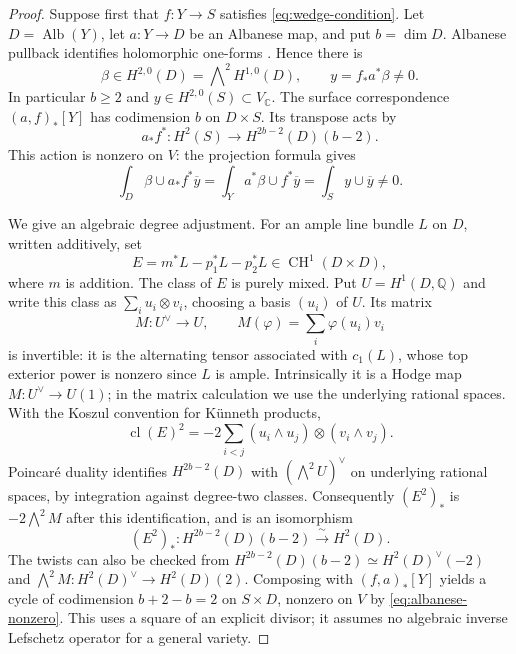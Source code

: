\begin{proof}
Suppose first that $f:Y\to S$ satisfies \eqref{eq:wedge-condition}. Let $D=\operatorname{Alb}(Y)$, let $a:Y\to D$ be an Albanese map, and put $b=\dim D$. Albanese pullback identifies holomorphic one-forms \cite[Chapter VI, \S9.2, pp.~315--316]{Albanese}. Hence there is
\[
 \beta\in H^{2,0}(D)=\bigwedge\nolimits^2H^{1,0}(D),\qquad
 y=f_*a^*\beta\ne0.
\]
In particular $b\ge2$ and $y\in H^{2,0}(S)\subset V_{\mathbb C}$. The surface correspondence $(a,f)_*[Y]$ has codimension $b$ on $D\times S$. Its transpose acts by
\[
 a_*f^*:H^2(S)\longrightarrow H^{2b-2}(D)(b-2).
\]
This action is nonzero on $V$: the projection formula gives
\begin{equation}\label{eq:albanese-nonzero}
 \int_D\beta\cup a_*f^*\overline y
 =\int_Ya^*\beta\cup f^*\overline y
 =\int_Sy\cup\overline y\ne0.
\end{equation}

We give an algebraic degree adjustment. For an ample line bundle $L$ on $D$, written additively, set
\[
 E=m^*L-p_1^*L-p_2^*L\in\operatorname{CH}^1(D\times D),
\]
where $m$ is addition. The class of $E$ is purely mixed. Put $U=H^1(D,\mathbb Q)$ and write this class as $\sum_i u_i\otimes v_i$, choosing a basis $(u_i)$ of $U$. Its matrix
\[
 M:U^\vee\longrightarrow U,\qquad
 M(\varphi)=\sum_i\varphi(u_i)v_i
\]
is invertible: it is the alternating tensor associated with $c_1(L)$, whose top exterior power is nonzero since $L$ is ample. Intrinsically it is a Hodge map $M:U^\vee\to U(1)$; in the matrix calculation we use the underlying rational spaces. With the Koszul convention for K\"unneth products,
\[
 \operatorname{cl}(E)^2
 =-2\sum_{i<j}(u_i\wedge u_j)\otimes(v_i\wedge v_j).
\]
Poincar\'e duality identifies $H^{2b-2}(D)$ with $(\bigwedge^2U)^\vee$ on underlying rational spaces, by integration against degree-two classes. Consequently $(E^2)_*$ is $-2\bigwedge^2M$ after this identification, and is an isomorphism
\begin{equation}\label{eq:degree-adjustment}
 (E^2)_*:H^{2b-2}(D)(b-2)\xrightarrow{\ \sim\ }H^2(D).
\end{equation}
The twists can also be checked from
$H^{2b-2}(D)(b-2)\simeq H^2(D)^\vee(-2)$ and
$\bigwedge^2M:H^2(D)^\vee\to H^2(D)(2)$.
Composing with $(f,a)_*[Y]$ yields a cycle of codimension $b+2-b=2$ on $S\times D$, nonzero on $V$ by \eqref{eq:albanese-nonzero}. This uses a square of an explicit divisor; it assumes no algebraic inverse Lefschetz operator for a general variety.


\end{proof}
